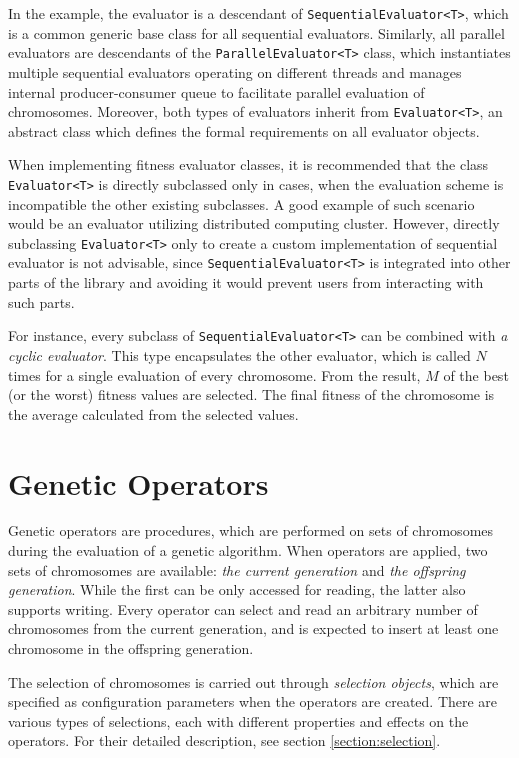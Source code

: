 In the example, the evaluator is a descendant of \texttt{SequentialEvaluator<T>}, which is a common generic base class for all sequential evaluators. Similarly, all parallel evaluators are descendants of the \texttt{ParallelEvaluator<T>} class, which instantiates multiple sequential evaluators operating on different threads and manages internal producer-consumer queue to facilitate parallel evaluation of chromosomes. Moreover, both types of evaluators inherit from \texttt{Evaluator<T>}, an abstract class which defines the formal requirements on all evaluator objects.

When implementing fitness evaluator classes, it is recommended that the class \texttt{Evaluator<T>} is directly subclassed only in cases, when the evaluation scheme is incompatible the other existing subclasses. A good example of such scenario would be an evaluator utilizing distributed computing cluster. However, directly subclassing \texttt{Evaluator<T>} only to create a custom implementation of sequential evaluator is not advisable, since \texttt{SequentialEvaluator<T>} is integrated into other parts of the library and avoiding it would prevent users from interacting with such parts.

For instance, every subclass of \texttt{SequentialEvaluator<T>} can be combined with \textit{a cyclic evaluator}. This type encapsulates the other evaluator, which is called $N$ times for a single evaluation of every chromosome. From the result, $M$ of the best (or the worst) fitness values are selected. The final fitness of the chromosome is the average calculated from the selected values.

\section{Genetic Operators}\label{section:genetic-operators}
Genetic operators are procedures, which are performed on sets of chromosomes during the evaluation of a genetic algorithm. When operators are applied, two sets of chromosomes are available: \textit{the current generation} and \textit{the offspring generation}. While the first can be only accessed for reading, the latter also supports writing. Every operator can select and read an arbitrary number of chromosomes from the current generation, and is expected to insert at least one chromosome in the offspring generation.

The selection of chromosomes is carried out through \textit{selection objects}, which are specified as configuration parameters when the operators are created. There are various types of selections, each with different properties and effects on the operators. For their detailed description, see section \ref{section:selection}.

